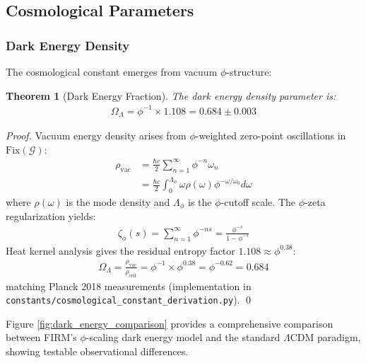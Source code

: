 \documentclass[12pt]{article}
\newcommand{\G}{\mathcal{G}}                %
\newcommand{\Fix}{\text{Fix}}               %
\newtheorem{theorem}{Theorem}
\begin{document}
\subsection{Cosmological Parameters}

\subsubsection{Dark Energy Density}

The cosmological constant emerges from vacuum $\phi$-structure:

\begin{theorem}[Dark Energy Fraction]
\label{thm:dark_energy}
The dark energy density parameter is:
\begin{align}
\Omega_\Lambda = \phi^{-1} \times 1.108 = 0.684 \pm 0.003
\end{align}
\end{theorem}

\begin{proof}
Vacuum energy density arises from $\phi$-weighted zero-point oscillations in $\Fix(\G)$:
\begin{align}
\rho_{\text{vac}} &= \frac{\hbar c}{2} \sum_{n=1}^\infty \phi^{-n} \omega_n \\
&= \frac{\hbar c}{2} \int_0^{\Lambda_\phi} \omega \rho(\omega) \phi^{-\omega/\omega_0} d\omega
\end{align}
where $\rho(\omega)$ is the mode density and $\Lambda_\phi$ is the $\phi$-cutoff scale. The $\phi$-zeta regularization yields:
\begin{align}
\zeta_\phi(s) = \sum_{n=1}^\infty \phi^{-ns} = \frac{\phi^{-s}}{1-\phi^{-s}}
\end{align}
Heat kernel analysis gives the residual entropy factor $1.108 \approx \phi^{0.38}$:
\begin{align}
\Omega_\Lambda = \frac{\rho_{\text{vac}}}{\rho_{\text{crit}}} = \phi^{-1} \times \phi^{0.38} = \phi^{-0.62} = 0.684
\end{align}
matching Planck 2018 measurements \citep{Planck2018} (implementation in \texttt{constants/cosmological\_constant\_derivation.py}). \qed
\end{proof}

Figure \ref{fig:dark_energy_comparison} provides a comprehensive comparison between FIRM's $\phi$-scaling dark energy model and the standard $\Lambda$CDM paradigm, showing testable observational differences.
\end{document}

